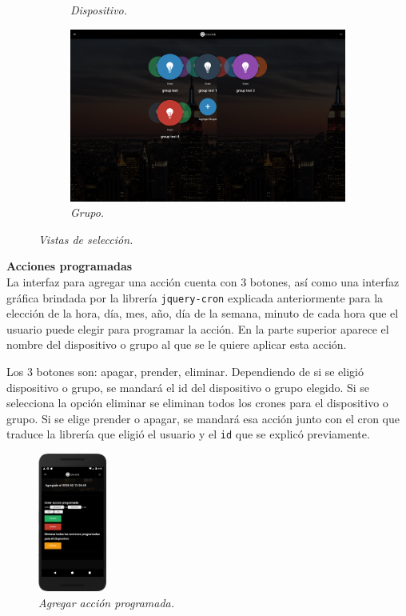 \begin{figure}[H]
\begin{subfigure}[b]{0.2\textwidth}
    \caption{\textit{Dispositivo.}}
    \label{fig:app-movil-choose-device}
  \end{subfigure}
  \begin{subfigure}[b]{0.6\textwidth}
    \includegraphics[width=\textwidth, keepaspectratio]{images/app-web-choose-group}
    \caption{\textit{Grupo.}}
    \label{fig:app-web-choose-group}
  \end{subfigure}

\caption{\textit{Vistas de selección.}}
\end{figure}

\textbf{Acciones programadas}\\
La interfaz para agregar una acción cuenta con 3 botones, así como una interfaz gráfica brindada por la librería \lstinline[columns=fixed]{jquery-cron} explicada anteriormente para la elección de la hora, día, mes, año, día de la semana, minuto de cada hora que el usuario puede elegir para programar la acción. En la parte superior aparece el nombre del dispositivo o grupo al que se le quiere aplicar esta acción.~

Los 3 botones son: apagar, prender, eliminar. Dependiendo de si se eligió dispositivo o grupo, se mandará el id del dispositivo o grupo elegido. Si se selecciona la opción eliminar se eliminan todos los crones para el dispositivo o grupo. Si se elige prender o apagar, se mandará esa acción junto con el cron que traduce la librería que eligió el usuario y el \lstinline[columns=fixed]{id} que se explicó previamente.

\begin{figure}[H]
  \centering
  \includegraphics[width=0.2\textwidth, keepaspectratio]{images/app-movil-scheduler-device}
  \caption{\textit{Agregar acción programada.}}
  \label{fig:app-movil-scheduler-device}
\end{figure}


